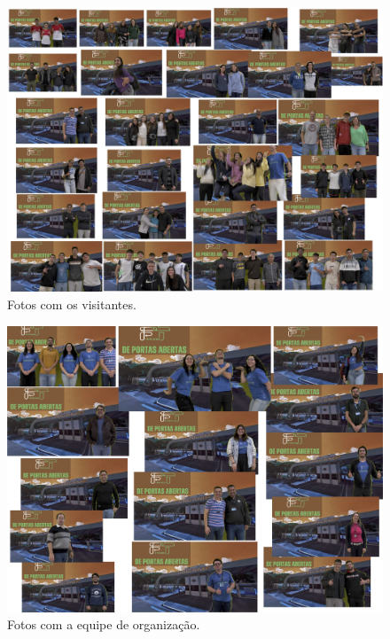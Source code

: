 \documentclass[
  letterpaper,
  DIV=11,
  numbers=noendperiod]{scrreprt}
\begin{document}
\begin{figure}[H]

{\centering \includegraphics[width=0.9\linewidth,height=\textheight,keepaspectratio]{planejamento/estudio-1.jpg}

}

\caption{Fotos com os visitantes.}

\end{figure}%

\begin{figure}[H]

{\centering \includegraphics[width=0.9\linewidth,height=\textheight,keepaspectratio]{planejamento/estudio-2.jpg}

}

\caption{Fotos com a equipe de organização.}

\end{figure}%
\end{document}
